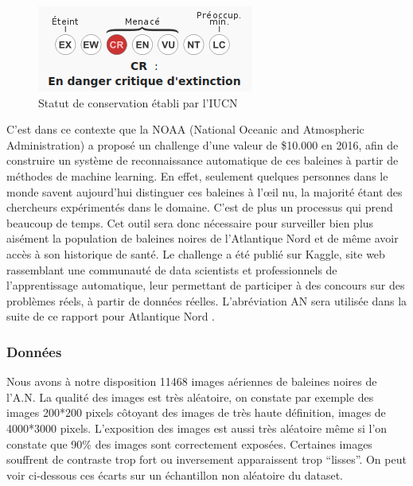 \documentclass[12pt,a4paper]{report}
\begin{document}
\begin{spacing}{1.5}
\begin{figure}[H]
\begin{center}
\includegraphics[scale=0.60]{figures/statut_conservation.png}
\caption{Statut de conservation établi par l'IUCN}
\end{center}
\end{figure}

C’est dans ce contexte que la NOAA (National Oceanic and Atmospheric Administration) a proposé un challenge d’une valeur de \$10.000 en 2016, afin de construire un système de reconnaissance automatique de ces baleines à partir de méthodes de machine learning. En effet, seulement quelques personnes dans le monde savent aujourd’hui distinguer ces baleines à l’œil nu, la majorité étant des chercheurs expérimentés dans le domaine. C’est de plus un processus qui prend beaucoup de temps. Cet outil sera donc nécessaire pour surveiller bien plus aisément la population de baleines noires de l’Atlantique Nord et de même avoir accès à son historique de santé. Le challenge a été publié sur Kaggle, site web rassemblant une communauté de data scientists et professionnels de l’apprentissage automatique, leur permettant de participer à des concours sur des problèmes réels, à partir de données réelles.
L'abréviation AN sera utilisée dans la suite de ce rapport pour \og Atlantique Nord \fg{}.
\subsubsection{Données}

Nous avons à notre disposition 11468 images aériennes de baleines noires de l’A.N. 
La qualité des images est très aléatoire, on constate par exemple des images 200*200 pixels côtoyant des images de très haute définition, images de 4000*3000 pixels. L’exposition des images est aussi très aléatoire même si l’on constate que 90\% des images sont correctement exposées. Certaines images souffrent de contraste trop fort ou inversement apparaissent trop “lisses”. On peut voir ci-dessous ces écarts sur un échantillon non aléatoire du dataset.

\newpage


\end{spacing}
\end{document}
